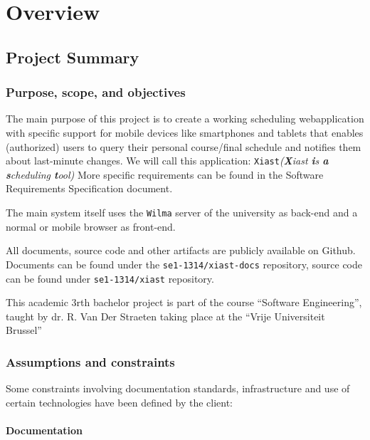 \documentclass[12pt]{article}
\begin{document}
\clearpage

\section{Overview}\label{overview}

\subsection{Project Summary}\label{project-summary}

\subsubsection{Purpose, scope, and
objectives}\label{purpose-scope-and-objectives}

The main purpose of this project is to create a working scheduling
webapplication with specific support for mobile devices like smartphones
and tablets that enables (authorized) users to query their personal
course/final schedule and notifies them about last-minute changes. We
will call this application: \texttt{Xiast}\emph{(\textbf{X}iast
\textbf{i}s \textbf{a} \textbf{s}cheduling \textbf{t}ool)} More specific
requirements can be found in the Software
Requirements Specification document.

The main system itself uses the \texttt{Wilma} server of the university
as back-end and a normal or mobile browser as front-end.

All documents, source code and other artifacts are publicly available on
Github. Documents can be found under the \verb=se1-1314/xiast-docs= repository, source code
can be found under \verb=se1-1314/xiast= repository.

This academic 3rth bachelor project is part of the course
``Software Engineering'', taught by dr. R. Van Der
Straeten taking place at the ``Vrije Universiteit Brussel''

\subsubsection{Assumptions and
constraints}\label{assumptions-and-constraints}

Some constraints involving documentation standards, infrastructure and
use of certain technologies have been defined by the client:

\paragraph{Documentation}\label{documentation}
\end{document}
